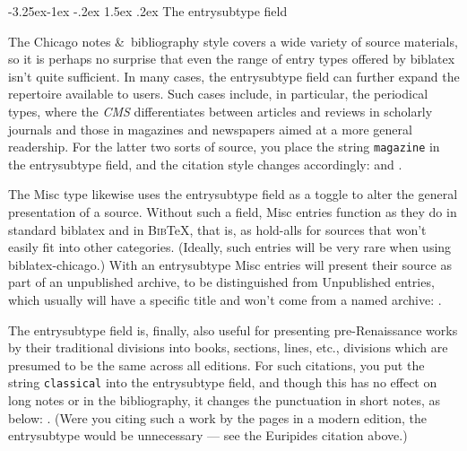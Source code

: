 \documentclass[a4paper,12pt]{article}
\makeatletter
\renewcommand{\section}{\@startsection{section}{1}{\z@}%
                                     {-3.25ex\@plus -1ex \@minus -.2ex}%
                                     {1.5ex \@plus .2ex}%
                                     {\normalfont\large\bfseries}}
\newcommand{\mylittlespace}{\vspace{5pt}}%
\makeatother
\begin{document}
\section{The \textsf{entrysubtype} field}
\label{sec:subtype}

\begin{refsection}
  The  Chicago notes \&\
  bibliography style covers a wide variety of source materials, so it
  is perhaps no surprise that even the range of entry types offered by
  \textsf{biblatex} isn't quite sufficient.  In many cases, the
  \textsf{entrysubtype} field can further expand the repertoire
  available to users.  Such cases include, in particular, the
  periodical types, where the \emph{CMS} differentiates between
  articles and reviews in scholarly journals and those in magazines
  and newspapers aimed at a more general readership.  For the latter
  two sorts of source, you place the string \texttt{magazine} in the
  \textsf{entrysubtype} field, and the citation style changes
  accordingly:
   and
  .

  \mylittlespace The \textsf{Misc} type likewise uses the
  \textsf{entrysubtype} field as a toggle to alter the general
  presentation of a source.  Without such a field, \textsf{Misc}
  entries function as they do in standard \textsf{biblatex} and in
  \textsc{Bib}\TeX, that is, as hold-alls for sources that won't
  easily fit into other categories.  (Ideally, such entries will be
  very rare when using \textsf{biblatex-chicago}.)  With an
  \textsf{entrysubtype} \textsf{Misc} entries will present their
  source as part of an unpublished archive, to be distinguished from
  \textsf{Unpublished} entries, which usually will have a specific
  title and won't come from a named archive:
  .

  \mylittlespace The \textsf{entrysubtype} field is, finally, also
  useful for presenting pre-Renaissance works by their traditional
  divisions into books, sections, lines, etc., divisions which are
  presumed to be the same across all editions.  For such citations,
  you put the string \texttt{classical} into the \textsf{entrysubtype}
  field, and though this has no effect on long notes or in the
  bibliography, it changes the punctuation in short notes, as below:
  .
  (Were you citing such a work by the pages in a modern edition, the
  \textsf{entrysubtype} would be unnecessary --- see the Euripides
  citation above.)

  {\renewcommand{\notesname}{\normalsize Note Style} \theendnotes}
  \printbibliography[title=\normalsize Bibliography Style]
\end{refsection}
\end{document}
